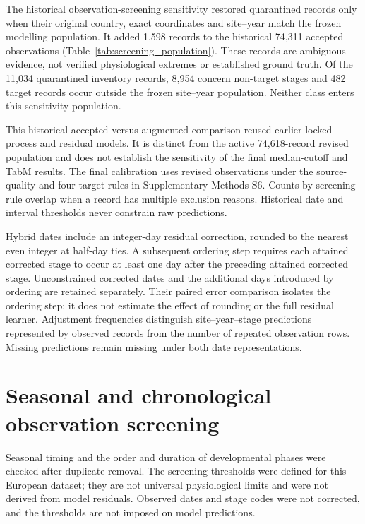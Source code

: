 \documentclass[a4paper,11pt]{article}
\let\OriginalSection\section
\renewcommand{\section}{\FloatBarrier\OriginalSection}
\begin{document}
The historical observation-screening sensitivity restored quarantined records only when
their original country, exact coordinates and site--year match the frozen
modelling population. It added 1,598 records to the historical 74,311 accepted observations
(Table~\ref{tab:screening_population}). These records are ambiguous evidence,
not verified physiological extremes or established ground truth. Of the
11,034 quarantined inventory records, 8,954 concern non-target stages and 482
target records occur outside the frozen site--year population. Neither class
enters this sensitivity population.

\begin{table}[!htbp]
\centering
\caption{Historical screening-sensitivity population within unchanged frozen sites and
years, preceding the active revised calibration. Restored records retain their original dates, BBCH codes and identities.
Calibration/test labels are inherited from the primary environmental-zone split;
restoration changes the evaluation population and does not refit either
process or residual models.}
\label{tab:screening_population}
\small

\end{table}

This historical accepted-versus-augmented comparison reused earlier locked process and residual models. It is distinct from the active 74,618-record revised population and does not establish the sensitivity of the final median-cutoff and TabM results. The final calibration uses revised observations under the source-quality and four-target rules in Supplementary Methods S6. Counts by screening rule overlap when a record has multiple exclusion reasons. Historical date and interval thresholds never constrain raw predictions.

Hybrid dates include an integer-day residual correction, rounded to the
nearest even integer at half-day ties. A subsequent ordering step requires
each attained corrected stage to occur at least one day after the preceding
attained corrected stage. Unconstrained corrected dates and the additional
days introduced by ordering are retained separately. Their paired error
comparison isolates the ordering step; it does not estimate the effect of
rounding or the full residual learner. Adjustment frequencies distinguish
site--year--stage predictions represented by observed records from the number
of repeated observation rows. Missing predictions remain missing under both
date representations.

\section{Seasonal and chronological observation screening}
Seasonal timing and the order and duration of developmental phases were checked after duplicate removal. The screening thresholds were defined for this European dataset; they are not universal physiological limits and were not derived from model residuals. Observed dates and stage codes were not corrected, and the thresholds are not imposed on model predictions.
\end{document}
